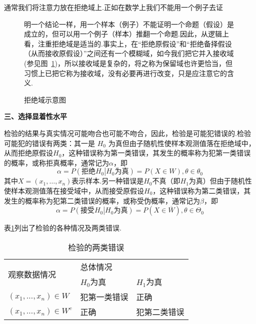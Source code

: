 通常我们将注意力放在拒绝域上.正如在数学上我们不能用一个例子去证
\begin{figure}[!htbp]
\begin{minipage}[t]{0.60\linewidth}	
明一个结论一样，用一个样本（例子）不能证明一个命题（假设）是成立的，但可以用一个例子（样本）推翻一个命题.因此，从逻辑上看，注重拒绝域是适当的.事实上，在“拒绝原假设”和“拒绝备择假设（从而接收原假设）”之间还有一个模糊域，如今我们把它并入接收域(参见图~\ref{fig7.1.1})，所以接收域是复杂的，将之称为保留域也许更恰当，但习惯上已把它称为接收域，没有必要再进行改变，只是应注意它的含义.
\end{minipage}
\begin{minipage}[t]{0.40\linewidth} 
	\vspace{-4pt}
	\begin{flushright}
		\caption{拒绝域示意图}\label{fig7.1.1}
	\end{flushright}
\end{minipage} 	
\end{figure}

\textbf{三、选择显着性水平}

检验的结果与真实情况可能吻合也可能不吻合，因此，检验是可能犯错误的.检验可能犯的错误有两类：其一是 $H_{0}$ 为真但由子随机性使样本观测值落在拒绝域中，从而拒绝原假设$H_{0}$，这种错误称为第一类错误，其发生的概率称为犯第一类错误的概率，或称拒真概率，通常记为$\alpha$，即
\begin{equation}\label{eq7.1.1}
\alpha =P\left(\textrm{拒绝}H_0\left| H_0\textrm{为真}\right.\right)=P\left(X\in W\right),\theta\in\theta_0
\end{equation}
其中$X= \left( x _ { 1 } , \dotsc , x _ { n } \right)$表示样本.另一种错误是$H_{0}$不真（即$H_{1}$为真）但由于随机性使样本观测值落在接受域中，从而接受原假设$H_{0}$，这种错误称为第二类错误，其发生的概率称为犯第二类错误的概率，或称受伪概率，通常记为$\beta$，即
\begin{equation}\label{eq7.1.2}
\alpha =P\left(\textrm{接受}H_0\left| H_0\textrm{为真}\right.\right)=P\left(X\in \overline{ W }\right),\theta\in\Theta_0
\end{equation}

表\ref{table7.1.1}列出了检验的各种情况及两类错误.
\begin{table}[!htp]
	\centering
	\caption{检验的两类错误}\label{table7.1.1}
		\begin{tabular}{lll}
	\hline
\multirow{2}{*}{观察数据情况} & \multicolumn{2}{l}{\hspace{4em}总体情况} \\ \cline{2-3} 
& $H_{0}$为真   & $H_{1}$为真     \\ \hline
$(x_{1},\dotsc,x_{n})\in W$ & 犯第一类错误 & 正确  \\ 
$(x_{1},\dotsc,x_{n})\in W^{c}$   & 正确  & 犯第二类错误        \\ \hline
	\end{tabular}
\end{table}

